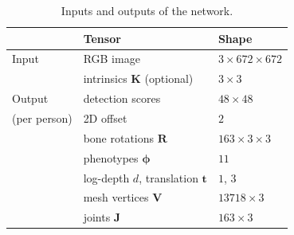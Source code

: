 
\begin{table}[h]
\centering\small
\begin{tabular}{lll}
\toprule
 & Tensor & Shape \\
\midrule
Input  & RGB image & $3{\times}672{\times}672$ \\
       & intrinsics $\mathbf{K}$ (optional) & $3{\times}3$ \\
\midrule
Output & detection scores & $48{\times}48$ \\
(per person) & 2D offset & $2$ \\
       & bone rotations $\mathbf{R}$ & $163{\times}3{\times}3$ \\
       & phenotypes $\boldsymbol{\phi}$ & $11$ \\
       & log-depth $d$, translation $\mathbf{t}$ & $1$, $3$ \\
       & mesh vertices $\mathbf{V}$ & $13718{\times}3$ \\
       & joints $\mathbf{J}$ & $163{\times}3$ \\
\bottomrule
\end{tabular}
\caption{Inputs and outputs of the network.}
\end{table}
